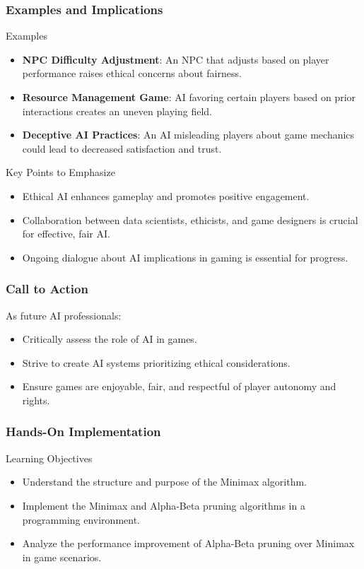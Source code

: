 \documentclass[aspectratio=169]{beamer}
\begin{document}
\begin{frame}[fragile]
    \frametitle{Examples and Implications}
    
    \begin{block}{Examples}
        \begin{itemize}
            \item \textbf{NPC Difficulty Adjustment}: An NPC that adjusts based on player performance raises ethical concerns about fairness.
            \item \textbf{Resource Management Game}: AI favoring certain players based on prior interactions creates an uneven playing field.
            \item \textbf{Deceptive AI Practices}: An AI misleading players about game mechanics could lead to decreased satisfaction and trust.
        \end{itemize}
    \end{block}

    \begin{block}{Key Points to Emphasize}
        \begin{itemize}
            \item Ethical AI enhances gameplay and promotes positive engagement.
            \item Collaboration between data scientists, ethicists, and game designers is crucial for effective, fair AI.
            \item Ongoing dialogue about AI implications in gaming is essential for progress.
        \end{itemize}
    \end{block}
\end{frame}

\begin{frame}[fragile]
    \frametitle{Call to Action}
    
    As future AI professionals:
    \begin{itemize}
        \item Critically assess the role of AI in games.
        \item Strive to create AI systems prioritizing ethical considerations.
        \item Ensure games are enjoyable, fair, and respectful of player autonomy and rights.
    \end{itemize}
\end{frame}

\begin{frame}
    \frametitle{Hands-On Implementation}
    \begin{block}{Learning Objectives}
        \begin{itemize}
            \item Understand the structure and purpose of the Minimax algorithm.
            \item Implement the Minimax and Alpha-Beta pruning algorithms in a programming environment.
            \item Analyze the performance improvement of Alpha-Beta pruning over Minimax in game scenarios.
        \end{itemize}
    \end{block}
\end{frame}
\end{document}
